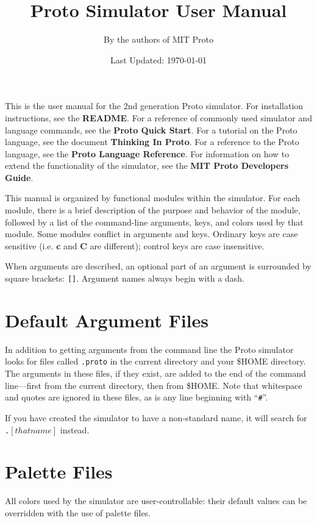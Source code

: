 \documentclass{article}
\title{Proto Simulator User Manual}
\author{By the authors of MIT Proto}
\date{Last Updated: \today}
\newcommand\var[1]{{\tt #1}}
\newcommand\key[1]{{\bf #1}}
\begin{document}
\maketitle

This is the user manual for the 2nd generation Proto simulator.  For
installation instructions, see the {\bf README}.  For
a reference of commonly used simulator and language commands, see the
{\bf Proto Quick Start}.  For a tutorial on the Proto language, see
the document {\bf Thinking In Proto}.  For a reference to the Proto
language, see the {\bf Proto Language Reference}.  For information on
how to extend the functionality of the simulator, see the {\bf MIT Proto
Developers Guide}.

This manual is organized by functional modules within the simulator.
For each module, there is a brief description of the purpose and
behavior of the module, followed by a list of the command-line
arguments, keys, and colors used by that module.  Some modules
conflict in arguments and keys.  Ordinary keys are case sensitive
(i.e.  \key{c} and \key{C} are different); control keys are case
insensitive.

When arguments are described, an optional part of an argument is
surrounded by square brackets: \var{[]}.  Argument names always begin
with a dash.




\section{Default Argument Files}

In addition to getting arguments from the command line the Proto
simulator looks for files called \var{.proto} in the current directory
and your \$HOME directory.  The arguments in these files, if they
exist, are added to the end of the command line---first from the
current directory, then from \$HOME.  Note that whitespace and quotes
are ignored in these files, as is any line beginning with ``\var{\#}''.

If you have created the simulator to have a non-standard name, it 
will search for \var{.}$[that name]$ instead.

\section{Palette Files}

All colors used by the simulator are user-controllable: their default
values can be overridden with the use of palette files.
\end{document}
